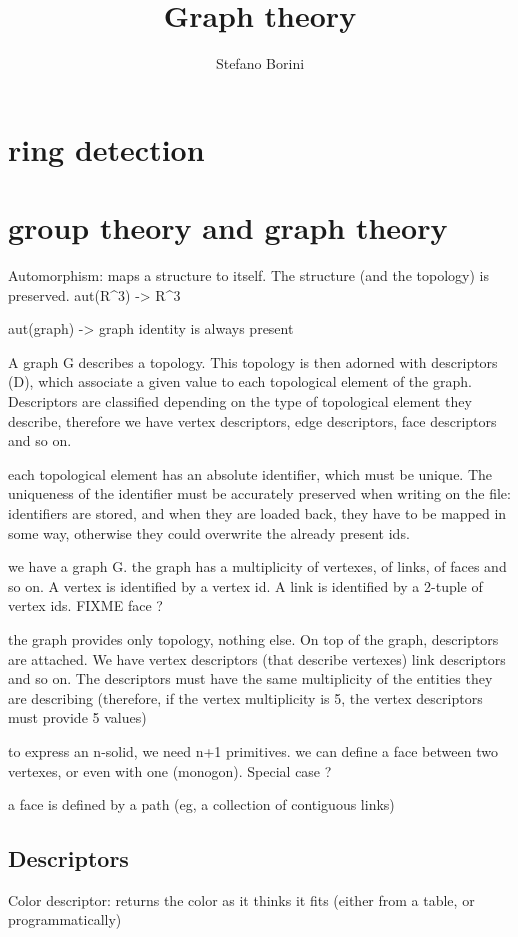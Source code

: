 \documentclass[a4paper,12pt,oneside]{book}
\title{Graph theory}
\author{Stefano Borini}
\begin{document}
\section{ring detection}

\section{group theory and graph theory}
Automorphism: maps a structure to itself. The structure (and the topology) is
preserved.
aut(R^3) -> R^3

aut(graph) -> graph
identity is always present 

A graph G describes a topology. This topology is then adorned with
descriptors (D), which associate a given value to each topological element of
the graph. Descriptors are classified depending on the type of topological
element they describe, therefore we have vertex descriptors, edge
descriptors, face descriptors and so on.

each topological element has an absolute identifier, which must be unique.
The uniqueness of the identifier must be accurately preserved when writing
on the file: identifiers are stored, and when they are loaded back, they
have to be mapped in some way, otherwise they could overwrite the already
present ids.

we have a graph G. the graph has a multiplicity of vertexes, of links, of
faces and so on. A vertex is identified by a vertex id. A link is identified
by a 2-tuple of vertex ids. FIXME face ?

the graph provides only topology, nothing else. On top of the graph,
descriptors are attached. We have vertex descriptors (that describe
vertexes) link descriptors and so on. The descriptors must have the same
multiplicity of the entities they are describing (therefore, if the vertex
multiplicity is 5, the vertex descriptors must provide 5 values)

to express an n-solid, we need n+1 primitives.
we can define a face between two vertexes, or even with one (monogon).
Special case ?

a face is defined by a path (eg, a collection of contiguous links)


\subsection{Descriptors}

Color descriptor: returns the color as it thinks it fits (either from a
table, or programmatically)
\end{document}
